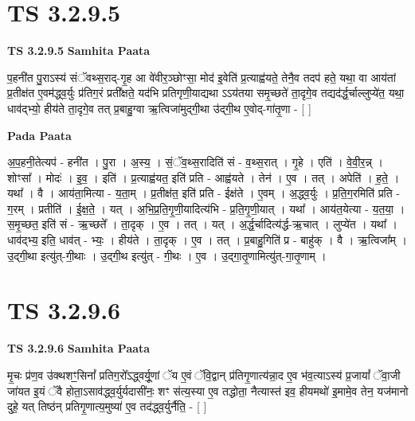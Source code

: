 \documentclass[17pt]{extarticle}
\begin{document}

\section{ TS 3.2.9.5 }

\textbf{TS 3.2.9.5 } \newline
\textbf{Samhita Paata} \newline

प॒हनी॑त पु॒राऽस्य॑ संॅवथ्स॒राद्-गृ॒ह आ वे॑वीर॒ञ्छोꣳसा॒ मोद॑ इ॒वेति॑ प्र॒त्याह्व॑यते॒ तेनै॒व तदप॑ हते॒ यथा॒ वा आय॑तां प्र॒तीक्ष॑त ए॒वम॑द्ध्व॒र्युः प्र॑तिग॒रं प्रती᳚क्षते॒ यद॑भि प्रतिगृणी॒याद्यथा ऽऽय॑तया समृ॒च्छते॑ ता॒दृगे॒व तद्यद॑र्द्ध॒र्चाल्लुप्ये॑त॒ यथा॒ धाव॑द्भ्यो॒ हीय॑ते ता॒दृगे॒व तत् प्र॒बाहु॒ग्वा ऋ॒त्विजा॑मुद्गी॒था उ॑द्गी॒थ ए॒वोद्-गा॑तृ॒णा - [  ] \newline

\textbf{Pada Paata} \newline

अ॒प॒हनी॒तेत्यप॑ - हनी॑त । पु॒रा । अ॒स्य॒ । सं॒ॅव॒थ्स॒रादिति॑ सं - व॒थ्स॒रात् । गृ॒हे । एति॑ । वे॒वी॒र॒न्न् । शोꣳसा᳚ । मोदः॑ । इ॒व॒ । इति॑ । प्र॒त्याह्व॑यत॒ इति॑ प्रति - आह्व॑यते । तेन॑ । ए॒व । तत् । अपेति॑ । ह॒ते॒ । यथा᳚ । वै । आय॑ता॒मित्या - य॒ता॒म् । प्र॒तीक्ष॑त॒ इति॑ प्रति - ईक्ष॑ते । ए॒वम् । अ॒द्ध्व॒र्युः । प्र॒ति॒ग॒रमिति॑ प्रति - ग॒रम् । प्रतीति॑ । ई॒क्ष॒ते॒ । यत् । अ॒भि॒प्र॒ति॒गृ॒णी॒यादित्य॑भि - प्र॒ति॒गृ॒णी॒यात् । यथा᳚ । आय॑त॒येत्या - य॒त॒या॒ । स॒मृ॒च्छत॒ इति॑ सं - ऋ॒च्छते᳚ । ता॒दृक् । ए॒व । तत् । यत् । अ॒र्द्ध॒र्चादित्य॑र्द्ध-ऋ॒चात् । लुप्ये॑त । यथा᳚ । धाव॑द्भ्य॒ इति॒ धाव॑त् - भ्यः॒ । हीय॑ते । ता॒दृक् । ए॒व । तत् । प्र॒बाहु॒गिति॑ प्र - बाहु॑क् । वै । ऋ॒त्विजा᳚म् । उ॒द्गी॒था इत्यु॑त्-गी॒थाः । उ॒द्गी॒थ इत्यु॑त् - गी॒थः । ए॒व । उ॒द्गा॒तृ॒णामित्यु॑त्-गा॒तृ॒णाम् ।  \newline





\section{ TS 3.2.9.6 }

\textbf{TS 3.2.9.6 } \newline
\textbf{Samhita Paata} \newline

मृ॒चः प्र॑ण॒व उ॑क्थशꣳ॒॒सिनां᳚ प्रतिग॒रो᳚ऽद्ध्वर्यू॒णां ॅय ए॒वं ॅवि॒द्वान् प्र॑तिगृ॒णात्य॑न्ना॒द ए॒व भ॑व॒त्याऽस्य॑ प्र॒जायां᳚ ॅवा॒जी जा॑यत इ॒यं ॅवै होता॒ऽसाव॑द्ध्व॒र्युर्यदासी॑नः॒ शꣳ स॑त्य॒स्या ए॒व तद्धोता॒ नैत्यास्त॑ इव॒ हीयमथो॑ इ॒मामे॒व तेन॒ यज॑मानो दुहे॒ यत् तिष्ठ॑न् प्रतिगृ॒णात्य॒मुष्या॑ ए॒व तद॑द्ध्व॒र्युर्नैति॒ - [  ] \newline
\end{document}
